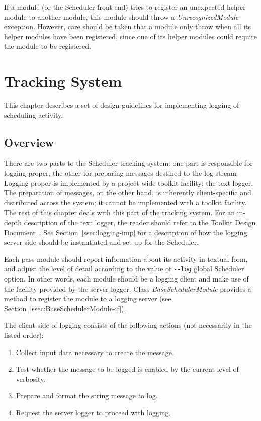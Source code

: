\documentclass[a4paper,twoside]{tce}
\begin{document}
If a module (or the Scheduler front-end) tries to register an unexpected
helper module to another module, this module should throw a
\emph{UnrecognizedModule} exception. However, care should be taken that a
module only throw when all its helper modules have been registered, since
one of its helper modules could require the module to be registered.



\chapter{Tracking System}
\label{ch:tracking}

This chapter describes a set of design guidelines for implementing logging
of scheduling activity.

\section{Overview}

There are two parts to the Scheduler tracking system: one part is
responsible for logging proper, the other for preparing messages destined to
the log stream.
%
Logging proper is implemented by a project-wide toolkit facility: the text
logger. The preparation of messages, on the other hand, is inherently
client-specific and distributed across the system; it cannot be implemented
with a toolkit facility.
%
The rest of this chapter deals with this part of the tracking system. For an
in-depth description of the text logger, the reader should refer to the
Toolkit Design Document~\cite{ToolkitDesign}. See
Section~\ref{ssec:logging-imp} for a description of how the logging server
side should be instantiated and set up for the Scheduler.

Each pass module should report information about its activity in textual
form, and adjust the level of detail according to the value of \verb|--log|
global Scheduler option. In other words, each module should be a logging
client and make use of the facility provided by the server logger.
%
Class \emph{BaseSchedulerModule} provides a method to register the module to
a logging server (see Section~\ref{ssec:BaseSchedulerModule-if}).

The client-side of logging consists of the following actions (not
necessarily in the listed order):
\begin{enumerate}
\item %
  Collect input data necessary to create the message.
\item %
  Test whether the message to be logged is enabled by the current level of
  verbosity.
\item %
  Prepare and format the string message to log.
\item %
  Request the server logger to proceed with logging.
\end{enumerate}
\end{document}
